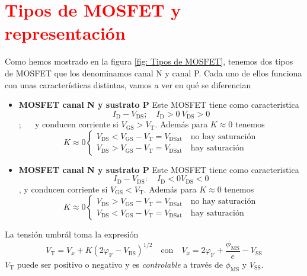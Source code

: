 \section{\textcolor{red}{Tipos de MOSFET y representación}}
Como hemos mostrado en la figura \ref{fig: Tipos de MOSFET}, tenemos dos tipos de MOSFET que los denominamos canal N y canal P. Cada uno de ellos funciona con unas características distintas, vamos a ver en qué se diferencian
\begin{itemize}
    \item \textbf{MOSFET canal N y sustrato P} Este MOSFET tiene como caracteristica $$I_\mathrm{D}-V_\mathrm{DS}; \quad I_\mathrm{D}>0 \ V_\mathrm{DS}>0$$; $\quad$  y conducen corriente si $V_\mathrm{GS}>V_\mathrm{T}$. Además para $K\approx 0$ tenemos 
    \begin{equation}
K \approx 0\left\{\begin{array}{l}
V_\mathrm{DS}<V_\mathrm{GS}-V_\mathrm{T}=V_\mathrm{DSat} \quad \text{no hay saturación} \\
V_\mathrm{DS}>V_\mathrm{GS}-V_\mathrm{T}=V_\mathrm{DSat} \quad \text{hay saturación}
\end{array}\right.
\end{equation}
    \item \textbf{MOSFET canal N y sustrato P} Este MOSFET tiene como caracteristica $$I_\mathrm{D}-V_\mathrm{DS}: \quad I_\mathrm{D}<0V_\mathrm{DS}<0$$, y conducen corriente si $V_\mathrm{GS}<V_\mathrm{T}$. Además para $K\approx 0$ tenemos 
\begin{equation}
K \approx 0\left\{\begin{array}{l}
V_\mathrm{DS}>V_\mathrm{GS}-V_\mathrm{T}=V_\mathrm{DSat} \quad \text{no hay saturación} \\
V_\mathrm{DS}<V_\mathrm{GS}-V_\mathrm{T}=V_\mathrm{DSat} \quad \text{hay saturación}
\end{array}\right.
\end{equation}
\end{itemize}
La tensión umbrál toma la expresión
\begin{equation}
V_\mathrm{T}=V_x+K(2\varphi_\mathrm{F}-V_\mathrm{BS})^{1/2} \quad \text{con} \quad V_x=2\varphi_\mathrm{F}+\frac{\phi_\mathrm{MS}}{e}-V_\mathrm{SS}
\end{equation}
$V_\mathrm{T}$ puede ser positivo o negativo y es \textit{controlable} a través de $\phi_\mathrm{MS}$ y $V_\mathrm{SS}$.
